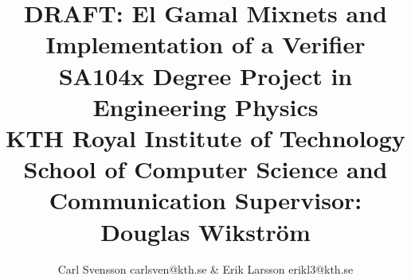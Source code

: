 \documentclass[10pt,a4paper]{article}
\author{Carl Svensson carlsven@kth.se \& Erik Larsson erikl3@kth.se}
\title{\textbf{DRAFT:} El Gamal Mixnets and Implementation of a Verifier \\ SA104x Degree Project in Engineering Physics \\
KTH Royal Institute of Technology \\
School of Computer Science and Communication
Supervisor: Douglas Wikström}
\begin{document}
\maketitle
\tableofcontents

\pagebreak








\end{document}
